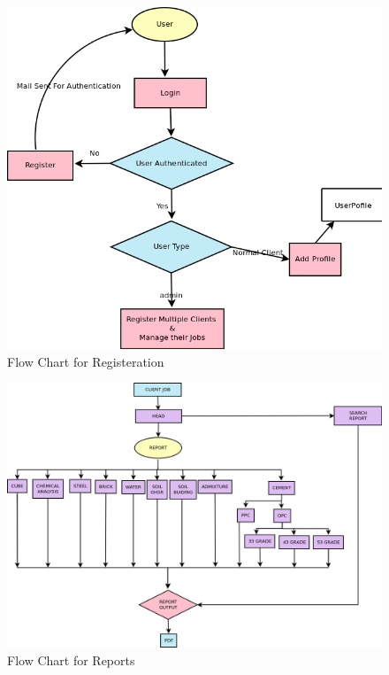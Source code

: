 \begin{figure}[h]
\centering \includegraphics[scale=0.8]{register.png}
\caption{Flow Chart for Registeration}
\end{figure} 
\newpage
\begin{figure}[h]
\vskip 3cm
\centering \includegraphics[scale=0.45]{report.png}
\caption{Flow Chart for Reports}
\end{figure} 
\newpage
